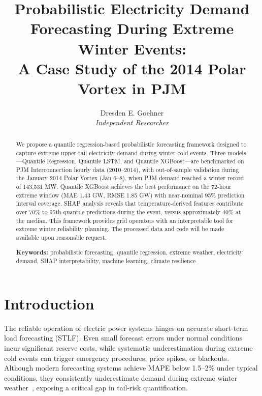 \documentclass[12pt,a4paper]{article}
\begin{document}
\title{\LARGE\textbf{Probabilistic Electricity Demand Forecasting During Extreme Winter Events:\\
A Case Study of the 2014 Polar Vortex in PJM}}
\author{Dresden E. Goehner\\[4pt]
\textit{Independent Researcher}}
\date{}
\maketitle

\begin{abstract}
\noindent
We propose a quantile regression-based probabilistic forecasting framework designed to capture extreme upper-tail electricity demand during winter cold events. Three models---Quantile Regression, Quantile LSTM, and Quantile XGBoost---are benchmarked on PJM Interconnection hourly data (2010--2014), with out-of-sample validation during the January 2014 Polar Vortex (Jan 6--8), when PJM demand reached a winter record of 143,531 MW. Quantile XGBoost achieves the best performance on the 72-hour extreme window (MAE 1.43 GW, RMSE 1.85 GW) with near-nominal 95\% prediction interval coverage. SHAP analysis reveals that temperature-derived features contribute over 70\% to 95th-quantile predictions during the event, versus approximately 40\% at the median. This framework provides grid operators with an interpretable tool for extreme winter reliability planning. The processed data and code will be made available upon reasonable request.

\medskip
\noindent\textbf{Keywords:} probabilistic forecasting, quantile regression, extreme weather, electricity demand, SHAP interpretability, machine learning, climate resilience
\end{abstract}

\newpage
\tableofcontents
\newpage

\section{Introduction}
\label{sec:intro}

The reliable operation of electric power systems hinges on accurate short-term load forecasting (STLF). Even small forecast errors under normal conditions incur significant reserve costs, while systematic underestimation during extreme cold events can trigger emergency procedures, price spikes, or blackouts. Although modern forecasting systems achieve MAPE below 1.5--2\% under typical conditions, they consistently underestimate demand during extreme winter weather~\cite{hong2016probabilistic,xie2016gefcom}, exposing a critical gap in tail-risk quantification.
\end{document}
